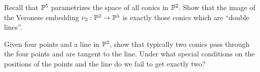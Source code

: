 \documentclass[12pt]{memoir}
\begin{document}
\begin{Ej}
  Recall that $\mathbb{P}^5$ parametrizes the space of all conics in $\mathbb{P}^2$. Show that the image of the Veronese embedding $\nu_2:\mathbb{P}^2\to\mathbb{P}^5$ is exactly those conics which are ``double lines''.
\end{Ej}

\begin{Ej}
  Given four points and a line in $\mathbb{P}^2$, show that typically
two conics pass through the four points and are tangent to the line. Under
what special conditions on the positions of the points and the line do we
fail to get exactly two? 
\end{Ej}
\end{document}
